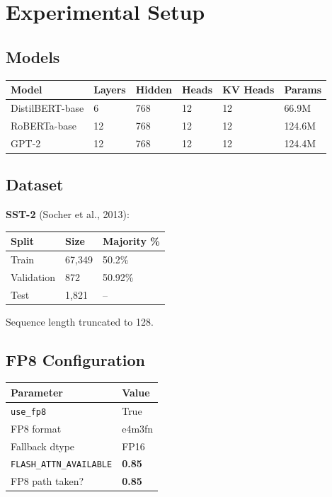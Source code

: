 
\section{Experimental Setup}

\subsection{Models}

\begin{table}[H]
\centering
\small
\begin{tabular}{llllll}
\toprule
\textbf{Model} & \textbf{Layers} & \textbf{Hidden} & \textbf{Heads} & \textbf{KV Heads} & \textbf{Params} \\
\midrule
DistilBERT-base & 6 & 768 & 12 & 12 & 66.9M \\
RoBERTa-base & 12 & 768 & 12 & 12 & 124.6M \\
GPT-2 & 12 & 768 & 12 & 12 & 124.4M \\
\bottomrule
\end{tabular}
\end{table}

\subsection{Dataset}

\textbf{SST-2} (Socher et al., 2013):

\begin{table}[H]
\centering
\small
\begin{tabular}{lll}
\toprule
\textbf{Split} & \textbf{Size} & \textbf{Majority \%} \\
\midrule
Train & 67,349 & 50.2\% \\
Validation & 872 & 50.92\% \\
Test & 1,821 & -- \\
\bottomrule
\end{tabular}
\end{table}

Sequence length truncated to 128.

\subsection{FP8 Configuration}

\begin{table}[H]
\centering
\small
\begin{tabular}{ll}
\toprule
\textbf{Parameter} & \textbf{Value} \\
\midrule
\texttt{use\_fp8} & True \\
FP8 format & e4m3fn \\
Fallback dtype & FP16 \\
\texttt{FLASH\_ATTN\_AVAILABLE} & \textbf{0.85} \\
FP8 path taken? & \textbf{0.85} \\
\bottomrule
\end{tabular}
\end{table}

